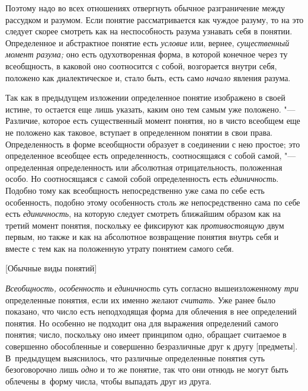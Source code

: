 Поэтому надо во всех отношениях отвергнуть обычное
разграничение между рассудком и разумом. Если понятие рассматривается как
чуждое разуму, то на это следует скорее смотреть как на неспособность
разума узнавать себя в понятии. Определенное и абстрактное понятие есть
{\em условие} или, вернее, {\em существенный момент
разума;} оно есть одухотворенная форма, в которой конечное
через ту всеобщность, в каковой оно соотносится с собой, возгорается внутри
себя, положено как диалектическое и, стало быть, есть само
{\em начало} явления разума.

Так как в предыдущем изложении определенное понятие изображено
в своей истине, то остается еще лишь указать, каким оно тем самым уже
положено. "--- Различие, которое есть существенный момент
понятия, но в чисто всеобщем еще не положено как таковое, вступает в
определенном понятии в свои права. Определенность в форме всеобщности
образует в соединении с нею простое; это определенное
всеобщее есть определенность, соотносящаяся с собой самой, "---
определенная определенность или абсолютная отрицательность,
положенная особо. Но соотносящаяся с самой собой определенность есть
{\em единичность}.
Подобно тому как всеобщность непосредственно уже сама по себе
есть особенность, подобно этому особенность столь же непосредственно сама
по себе есть {\em единичность},
на которую следует смотреть ближайшим образом как на третий
момент понятия, поскольку ее фиксируют как {\em противостоящую} двум
первым, но также и как на абсолютное возвращение понятия внутрь себя и
вместе с тем как на положенную утрату понятием самого себя.

%
{[Обычные виды понятий]}

{\em Всеобщность, особенность} и {\em единичность} суть согласно
вышеизложенному {\em три} определенные понятия, если их именно желают
{\em считать}. Уже ранее было показано, что число есть неподходящая форма для
облечения в нее определений понятия. Но особенно не подходит она для выражения определений самого
понятия; число, поскольку оно имеет принципом одно, обращает считаемое в
совершенно обособленные и совершенно безразличные друг к другу [предметы].
В~предыдущем выяснилось, что различные определенные понятия суть безоговорочно
лишь {\em одно} и то же понятие, так что они отнюдь не могут быть облечены
в~форму числа, чтобы выпадать друг из друга.

